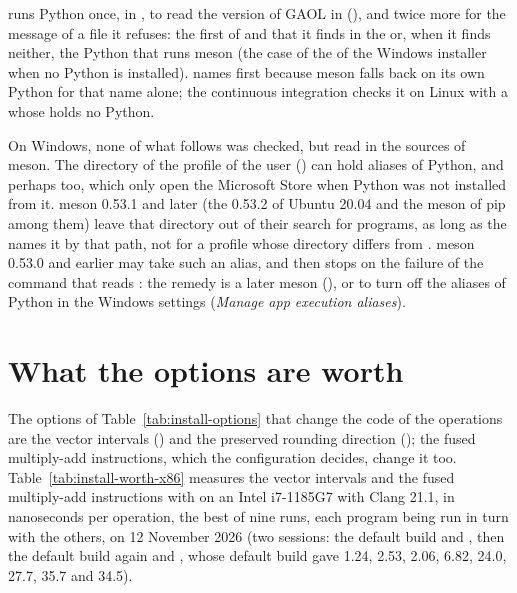 \medskip
{} runs Python once, in , to read the version
of GAOL in  (), and twice more
for the message of a file it refuses: the first of  and
 that it finds in the  or, when it finds neither, the
Python that runs meson (the case of the  of the Windows
installer when no Python is installed).  names
 first because meson falls back on its own Python for that name
alone; the continuous integration checks it on Linux with a 
whose  holds no Python.

\begin{Rem}
On Windows, none of what follows was checked, but read in the sources of
meson. The directory  of the profile of the user
()
can hold aliases of Python,  and perhaps 
too, which only open the Microsoft Store when Python was not installed from
it. meson 0.53.1 and later (the 0.53.2 of Ubuntu 20.04 and the meson of pip
among them) leave that directory out of their search for programs, as long as
the  names it by that path, not for a profile whose directory
differs from . meson 0.53.0 and earlier may take such an
alias, and  then stops on the failure of the command that
reads : the remedy is a later meson
(), or to turn off the aliases of Python in the
Windows settings (\emph{Manage app execution aliases}).
\end{Rem}

\section{What the options are worth}\label{sec:install-options-worth}

The options of Table~\ref{tab:install-options} that change the code of the
operations are the vector intervals () and the preserved
rounding direction (); the fused
multiply-add instructions, which the configuration decides, change it too.
Table~\ref{tab:install-worth-x86} measures the vector intervals and the fused
multiply-add instructions with
 on an Intel i7-1185G7 with Clang 21.1, in nanoseconds per operation, the best of nine runs, each program being run in turn with the others, on 12 November 2026 (two sessions: the default build and , then the default build again and , whose default build gave 1.24, 2.53, 2.06, 6.82, 24.0, 27.7, 35.7 and 34.5).

